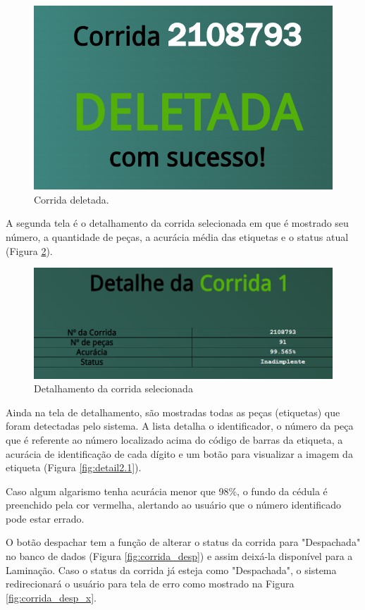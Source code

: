 \begin{figure}[H]
	\centering
	\includegraphics[width=0.5\linewidth]{figuras/WebService/Screens/corrida_delete.png}
	\caption{Corrida deletada.}
	\label{fig:corrida_delete}
\end{figure}

A segunda tela é o detalhamento da corrida selecionada em que é mostrado seu número, a quantidade de peças, a acurácia média das etiquetas e o status atual (Figura \ref{fig:detalCorrida}).

\begin{figure}[H]
	\centering
	\includegraphics[width=0.7\linewidth]{figuras/WebService/Screens/detail 1.png}
	\caption{Detalhamento da corrida selecionada}
	\label{fig:detalCorrida}
\end{figure}

Ainda na tela de detalhamento, são mostradas todas as peças (etiquetas) que foram detectadas pelo sistema. A lista detalha o identificador, o número da peça que é referente ao número localizado acima do código de barras da etiqueta, a acurácia de identificação de cada dígito e um botão para visualizar a imagem da etiqueta (Figura \ref{fig:detail2.1}).

Caso algum algarismo tenha acurácia menor que 98\%, o fundo da cédula é preenchido pela cor vermelha, alertando ao usuário que o número identificado pode estar errado.

O botão despachar tem a função de alterar o status da corrida para "Despachada" no banco de dados (Figura \ref{fig:corrida_desp}) e assim deixá-la disponível para a Laminação. Caso o status da corrida já esteja como "Despachada", o sistema redirecionará o usuário para tela de erro como mostrado na Figura \ref{fig:corrida_desp_x}. 

